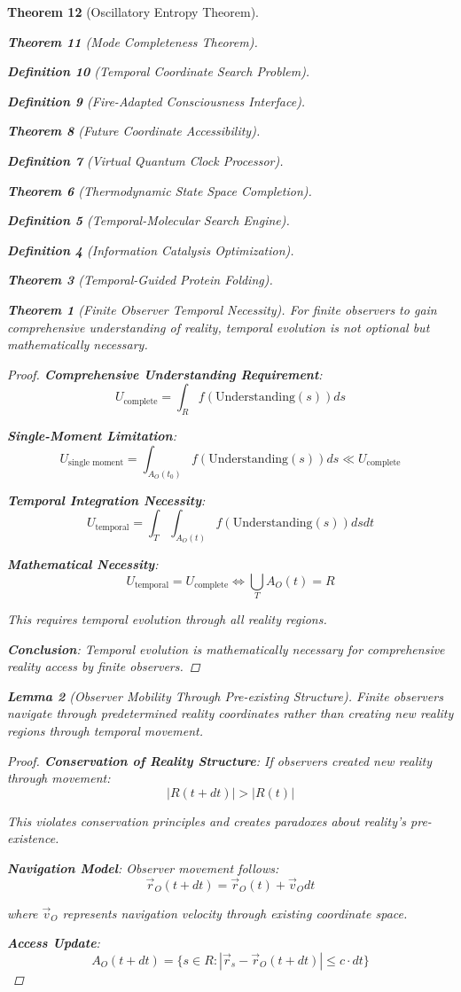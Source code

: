 \documentclass[12pt,a4paper]{article}
\newtheorem{theorem}{Theorem}[section]
\newtheorem{lemma}[theorem]{Lemma}
\newtheorem{definition}[theorem]{Definition}
\begin{document}
\begin{theorem}[Oscillatory Entropy Theorem]
\begin{theorem}[Mode Completeness Theorem]
\begin{enumerate}
\begin{definition}[Temporal Coordinate Search Problem]
\begin{algorithm}
\begin{definition}[Fire-Adapted Consciousness Interface]
\begin{theorem}[Future Coordinate Accessibility]
\begin{definition}[Virtual Quantum Clock Processor]
\begin{itemize}
\begin{itemize}
\begin{theorem}[Thermodynamic State Space Completion]
\begin{definition}[Temporal-Molecular Search Engine]
\begin{definition}[Information Catalysis Optimization]
\begin{algorithm}
\begin{theorem}[Temporal-Guided Protein Folding]
\begin{table}[h]
\begin{theorem}[Finite Observer Temporal Necessity]
For finite observers to gain comprehensive understanding of reality, temporal evolution is not optional but mathematically necessary.
\end{theorem}

\begin{proof}
\textbf{Comprehensive Understanding Requirement}:
$$U_{\text{complete}} = \int_{R} f(\text{Understanding}(s)) ds$$

\textbf{Single-Moment Limitation}:
$$U_{\text{single moment}} = \int_{A_O(t_0)} f(\text{Understanding}(s)) ds \ll U_{\text{complete}}$$

\textbf{Temporal Integration Necessity}:
$$U_{\text{temporal}} = \int_T \int_{A_O(t)} f(\text{Understanding}(s)) ds dt$$

\textbf{Mathematical Necessity}:
$$U_{\text{temporal}} = U_{\text{complete}} \Leftrightarrow \bigcup_T A_O(t) = R$$

This requires temporal evolution through all reality regions.

\textbf{Conclusion}: Temporal evolution is mathematically necessary for comprehensive reality access by finite observers.
\end{proof}

\begin{lemma}[Observer Mobility Through Pre-existing Structure]
Finite observers navigate through predetermined reality coordinates rather than creating new reality regions through temporal movement.
\end{lemma}

\begin{proof}
\textbf{Conservation of Reality Structure}: If observers created new reality through movement:
$$|R(t + dt)| > |R(t)|$$

This violates conservation principles and creates paradoxes about reality's pre-existence.

\textbf{Navigation Model}: Observer movement follows:
$$\vec{r}_O(t+dt) = \vec{r}_O(t) + \vec{v}_O dt$$

where $\vec{v}_O$ represents navigation velocity through existing coordinate space.

\textbf{Access Update}:
$$A_O(t+dt) = \{s \in R : |\vec{r}_s - \vec{r}_O(t+dt)| \leq c \cdot dt\}$$


\end{proof}
\end{table}
\end{theorem}
\end{algorithm}
\end{definition}
\end{definition}
\end{theorem}
\end{itemize}
\end{itemize}
\end{definition}
\end{theorem}
\end{definition}
\end{algorithm}
\end{definition}
\end{enumerate}
\end{theorem}
\end{theorem}
\end{document}
